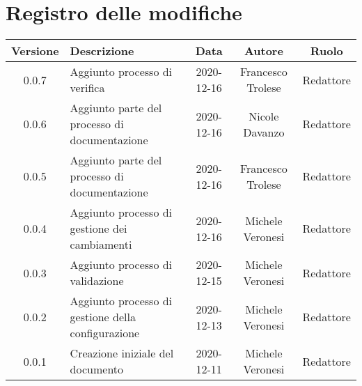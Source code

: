 \section*{Registro delle modifiche}

\begin{center}
	\begin{longtable}{|c|p{5cm}|c|c|c|}
	\hline
	\rowcolor{lighter-grayer}
	\textbf{Versione} & \textbf{Descrizione} & \textbf{Data} & \textbf{Autore} & \textbf{Ruolo} \\
	\hline
	\endfirsthead


	\hline
	0.0.7 & Aggiunto processo di verifica & 2020-12-16 & Francesco Trolese & Redattore \\
	0.0.6 & Aggiunto parte del processo di documentazione & 2020-12-16 & Nicole Davanzo & Redattore \\
	0.0.5 & Aggiunto parte del processo di documentazione & 2020-12-16 & Francesco Trolese & Redattore \\
	0.0.4 & Aggiunto processo di gestione dei cambiamenti & 2020-12-16 & Michele Veronesi & Redattore \\
	0.0.3 & Aggiunto processo di validazione & 2020-12-15 & Michele Veronesi & Redattore \\
	0.0.2 & Aggiunto processo di gestione della configurazione & 2020-12-13 & Michele Veronesi & Redattore \\
	0.0.1 & Creazione iniziale del documento & 2020-12-11 & Michele Veronesi & Redattore \\
	\hline

	\end{longtable}
\end{center}